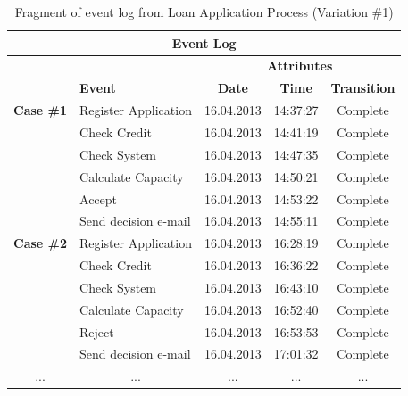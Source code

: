 \begin{table}[h]
\centering
\caption{Fragment of event log from Loan Application Process (Variation \#1)}
\label{table:event-log-loan}
\begin{tabular}{@{}llccc@{}}
\toprule
\multicolumn{5}{c}{\textbf{Event Log}}                                                                  \\ \midrule
                        &                         & \multicolumn{3}{c}{\textbf{Attributes}}             \\ \midrule
                        & \textbf{Event}          & \textbf{Date} & \textbf{Time} & \textbf{Transition} \\ \midrule
\textbf{Case \#1}       & Register Application    & 16.04.2013    & 14:37:27      & Complete            \\ \midrule
                        & Check Credit            & 16.04.2013    & 14:41:19      & Complete            \\ \midrule
                        & Check System            & 16.04.2013    & 14:47:35      & Complete            \\ \midrule
                        & Calculate Capacity      & 16.04.2013    & 14:50:21      & Complete            \\ \midrule
                        & Accept                  & 16.04.2013    & 14:53:22      & Complete            \\ \midrule
                        & Send decision e-mail    & 16.04.2013    & 14:55:11      & Complete            \\ \midrule
\textbf{Case \#2}       & Register Application    & 16.04.2013    & 16:28:19      & Complete            \\ \midrule
                        & Check Credit            & 16.04.2013    & 16:36:22      & Complete            \\ \midrule
                        & Check System            & 16.04.2013    & 16:43:10      & Complete            \\ \midrule
                        & Calculate Capacity      & 16.04.2013    & 16:52:40      & Complete            \\ \midrule
                        & Reject                  & 16.04.2013    & 16:53:53      & Complete            \\ \midrule
                        & Send decision e-mail    & 16.04.2013    & 17:01:32      & Complete            \\ \midrule
\multicolumn{1}{c}{...} & \multicolumn{1}{c}{...} & ...           & ...           & ...                 \\ \bottomrule
\end{tabular}
\end{table}

